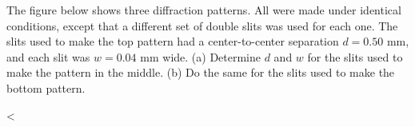 The figure below shows three diffraction patterns. All
were made under identical conditions, except that a
different set of double slits was used for each one. The
slits used to make the top pattern had a center-to-center
separation $d=0.50$ mm, and each slit was $w=0.04$ mm wide.
(a) Determine $d$ and $w$ for the slits used to make the
pattern in the middle. (b) Do the same for the slits used to
make the bottom pattern.

<%
